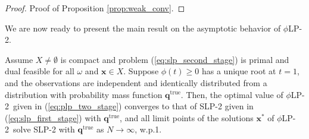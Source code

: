 \documentclass[opre,nonblindrev]{informs3} %
\renewcommand{\P}{\mathbb{P}}
\newcommand{\x}{\mathbf{x}}
\newcommand{\q}{\mathbf{q}}
\newcommand{\qtrue}{\q^{\text{true}}}
\newcommand{\plp}{$\phi$LP-2}
\begin{document}
\begin{proof}{\sc Proof of Proposition \ref{prop:weak_conv}.}
%	
	\Halmos
% 
%
%
%
%
%
\end{proof}

We are now ready to present the main result on the asymptotic behavior of \plp. 


\begin{theorem}
	\label{thm:epiconvergence}
	Assume $X \neq \emptyset$ is compact and problem (\ref{eq:slp_second_stage}) is primal and dual feasible for all $\omega$ and $\x \in X$.
	Suppose $\phi(t) \geq 0$ has a unique root at $t = 1$, and the observations are independent and identically distributed from a distribution with probability mass function $\qtrue$. 
	Then, the optimal value of \plp\ given in (\ref{eq:plp_two_stage}) converges to that of SLP-2 given in (\ref{eq:slp_first_stage}) with $\qtrue$, and all limit points of the solutions $\x^*$ of \plp\ solve SLP-2 with $\qtrue$ as $N \rightarrow \infty$, w.p.1.
\end{theorem}
\end{document}
